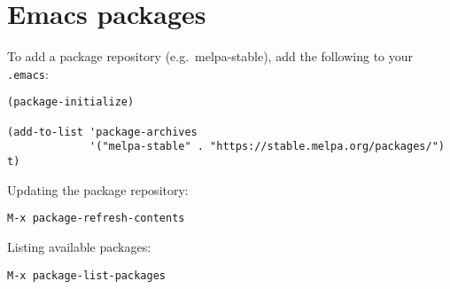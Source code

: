 \documentclass[a4paper,12pt]{report}
\begin{document}
\chapter{Emacs packages}

To add a package repository (e.g.\ melpa-stable), add the following to your \verb+.emacs+:
\begin{verbatim}
(package-initialize)

(add-to-list 'package-archives
             '("melpa-stable" . "https://stable.melpa.org/packages/") t)
\end{verbatim}

Updating the package repository:
\begin{verbatim}
M-x package-refresh-contents
\end{verbatim}

Listing available packages:
\begin{verbatim}
M-x package-list-packages
\end{verbatim}
\end{document}
